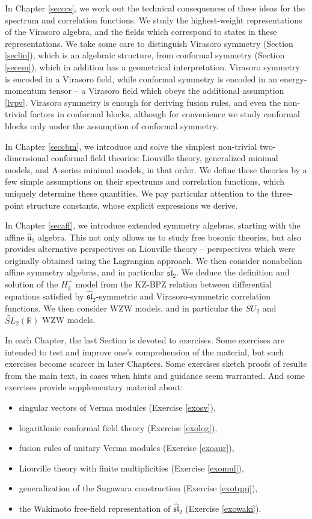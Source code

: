 \documentclass[12pt,a4paper,notitlepage]{report}
\numberwithin{equation}{section}
\theoremstyle{break}
\begin{document}
In Chapter \ref{secccs}, we work out the technical consequences of these ideas for the spectrum and correlation functions.
We study the highest-weight representations of the Virasoro algebra, and the fields which correspond to states in these representations.
We take some care to distinguish Virasoro symmetry (Section \ref{seclin}), which is an algebraic structure, from conformal symmetry (Section \ref{secem}), which in addition has a geometrical interpretation.
Virasoro symmetry is encoded in a Virasoro field, while conformal symmetry is encoded in an energy-momentum tensor -- a Virasoro field which obeys the additional assumption \eqref{lvpv}.
Virasoro symmetry is enough for deriving fusion rules, and even the non-trivial factors in conformal blocks, although for convenience we study conformal blocks only under the assumption of conformal symmetry. 

In Chapter \ref{seccbm}, we introduce and solve the simplest non-trivial two-dimensional conformal field theories: Liouville theory, generalized minimal models, and A-series minimal models, in that order.
We define these theories by a few simple assumptions on their spectrums and correlation functions, which uniquely determine these quantities.
We pay particular attention to the three-point structure constants, whose explicit expressions we derive. 

In Chapter \ref{secaff}, we introduce extended symmetry algebras, starting with the affine $\hat{\mathfrak{u}}_1$ algebra.
This not only allows us to study free bosonic theories, but also provides alternative perspectives on Liouville theory -- perspectives which were originally obtained using the Lagrangian approach.
We then consider nonabelian affine symmetry algebras, and in particular $\widehat{\mathfrak{sl}}_2$.
We deduce the definition and solution of the $H_3^+$ model from the KZ-BPZ relation between differential equations satisfied by $\widehat{\mathfrak{sl}}_2$-symmetric and Virasoro-symmetric correlation functions.
We then consider WZW models, and in particular the $SU_2$ and $\widetilde{SL}_2(\mathbb{R})$ WZW models. 

In each Chapter, the last Section is devoted to exercises.
Some exercises are intended to test and improve one's comprehension of the material, but such exercises become scarcer in later Chapters.
Some exercises sketch proofs of results from the main text, in cases when hints and guidance seem warranted.
And some exercises provide supplementary material about: 
\begin{itemize}
 \item singular vectors of Verma modules (Exercise \ref{exosv}),
\item logarithmic conformal field theory (Exercise \ref{exolog}), 
\item fusion rules of unitary Verma modules (Exercise \ref{exoaur}), 
\item Liouville theory with finite multiplicities (Exercise \ref{exomul}),
\item generalization of the Sugawara construction (Exercise \ref{exotqpj}),
\item the Wakimoto free-field representation of $\widehat{\mathfrak{sl}}_2$ (Exercise \ref{exowaki}).
\end{itemize}
\end{document}
